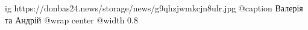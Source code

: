  
 
 
 
 

\ifcmt
  ig https://donbas24.news/storage/news/g9qhzjwmkcjn8ulr.jpg
	@caption Валерія та Андрій
  @wrap center
  @width 0.8
\fi
